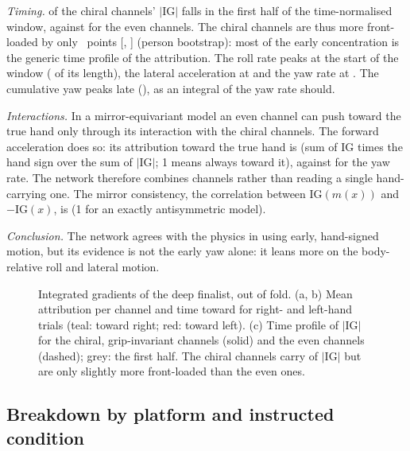 \emph{Timing.}  of the chiral channels' $|\mathrm{IG}|$ falls in the first half of the time-normalised window, against  for the even channels.
The chiral channels are thus more front-loaded by only ~points [, ] (person bootstrap): most of the early concentration is the generic time profile of the attribution.
The roll rate peaks at the start of the window ( of its length), the lateral acceleration at  and the yaw rate at .
The cumulative yaw peaks late (), as an integral of the yaw rate should.

\emph{Interactions.} In a mirror-equivariant model an even channel can push toward the true hand only through its interaction with the chiral channels.
The forward acceleration does so: its attribution toward the true hand is  (sum of IG times the hand sign over the sum of $|\mathrm{IG}|$; 1 means always toward it), against  for the yaw rate.
The network therefore combines channels rather than reading a single hand-carrying one.
The mirror consistency, the correlation between $\mathrm{IG}(m(x))$ and $-\mathrm{IG}(x)$, is  (1 for an exactly antisymmetric model).

\emph{Conclusion.} The network agrees with the physics in using early, hand-signed motion, but its evidence is not the early yaw alone: it leans more on the body-relative roll and lateral motion.

\begin{figure}[tbp]
  \centering
  \caption{Integrated gradients of the deep finalist, out of fold. (a, b) Mean attribution per channel and time toward \pright{} for right- and left-hand trials (teal: toward right; red: toward left). (c) Time profile of $|\mathrm{IG}|$ for the chiral, grip-invariant channels (solid) and the even channels (dashed); grey: the first half. The chiral channels carry  of $|\mathrm{IG}|$ but are only slightly more front-loaded than the even ones.}
  \label{fig:M3_05_saliency}\label{fig:app:m3-saliency}
\end{figure}

\subsection{Breakdown by platform and instructed condition}\label{app:m3:breakdown}

